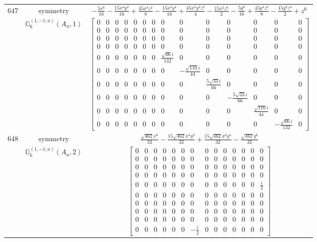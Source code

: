 \documentclass[fleqn,8pt,landscape]{jsarticle}
\begin{document}
\begin{longtable}{ccc}
$ 647 $ & $ \text{symmetry} $ & $ - \frac{5 x^{6}}{16} - \frac{15 x^{4} y^{2}}{16} + \frac{45 x^{4} z^{2}}{8} - \frac{15 x^{2} y^{4}}{16} + \frac{45 x^{2} y^{2} z^{2}}{4} - \frac{15 x^{2} z^{4}}{2} - \frac{5 y^{6}}{16} + \frac{45 y^{4} z^{2}}{8} - \frac{15 y^{2} z^{4}}{2} + z^{6} $ \\
$  $ & $ \mathbb{G}_{6}^{(1,-1;a)}(A_{u},1) $ & $ \begin{bmatrix} 0 & 0 & 0 & 0 & 0 & 0 & 0 & 0 & 0 & 0 & 0 & 0 & 0 & 0 \\ 0 & 0 & 0 & 0 & 0 & 0 & 0 & 0 & 0 & 0 & 0 & 0 & 0 & 0 \\ 0 & 0 & 0 & 0 & 0 & 0 & 0 & 0 & 0 & 0 & 0 & 0 & 0 & 0 \\ 0 & 0 & 0 & 0 & 0 & 0 & 0 & 0 & 0 & 0 & 0 & 0 & 0 & 0 \\ 0 & 0 & 0 & 0 & 0 & 0 & 0 & \frac{\sqrt{66} i}{132} & 0 & 0 & 0 & 0 & 0 & 0 \\ 0 & 0 & 0 & 0 & 0 & 0 & 0 & 0 & - \frac{\sqrt{110} i}{44} & 0 & 0 & 0 & 0 & 0 \\ 0 & 0 & 0 & 0 & 0 & 0 & 0 & 0 & 0 & \frac{5 \sqrt{33} i}{66} & 0 & 0 & 0 & 0 \\ 0 & 0 & 0 & 0 & 0 & 0 & 0 & 0 & 0 & 0 & - \frac{5 \sqrt{33} i}{66} & 0 & 0 & 0 \\ 0 & 0 & 0 & 0 & 0 & 0 & 0 & 0 & 0 & 0 & 0 & \frac{\sqrt{110} i}{44} & 0 & 0 \\ 0 & 0 & 0 & 0 & 0 & 0 & 0 & 0 & 0 & 0 & 0 & 0 & - \frac{\sqrt{66} i}{132} & 0 \end{bmatrix} $ \\ \hline
$ 648 $ & $ \text{symmetry} $ & $ \frac{\sqrt{462} x^{6}}{32} - \frac{15 \sqrt{462} x^{4} y^{2}}{32} + \frac{15 \sqrt{462} x^{2} y^{4}}{32} - \frac{\sqrt{462} y^{6}}{32} $ \\
$  $ & $ \mathbb{G}_{6}^{(1,-1;a)}(A_{u},2) $ & $ \begin{bmatrix} 0 & 0 & 0 & 0 & 0 & 0 & 0 & 0 & 0 & 0 & 0 & 0 & 0 & 0 \\ 0 & 0 & 0 & 0 & 0 & 0 & 0 & 0 & 0 & 0 & 0 & 0 & 0 & 0 \\ 0 & 0 & 0 & 0 & 0 & 0 & 0 & 0 & 0 & 0 & 0 & 0 & 0 & 0 \\ 0 & 0 & 0 & 0 & 0 & 0 & 0 & 0 & 0 & 0 & 0 & 0 & 0 & 0 \\ 0 & 0 & 0 & 0 & 0 & 0 & 0 & 0 & 0 & 0 & 0 & 0 & 0 & \frac{i}{2} \\ 0 & 0 & 0 & 0 & 0 & 0 & 0 & 0 & 0 & 0 & 0 & 0 & 0 & 0 \\ 0 & 0 & 0 & 0 & 0 & 0 & 0 & 0 & 0 & 0 & 0 & 0 & 0 & 0 \\ 0 & 0 & 0 & 0 & 0 & 0 & 0 & 0 & 0 & 0 & 0 & 0 & 0 & 0 \\ 0 & 0 & 0 & 0 & 0 & 0 & 0 & 0 & 0 & 0 & 0 & 0 & 0 & 0 \\ 0 & 0 & 0 & 0 & 0 & 0 & - \frac{i}{2} & 0 & 0 & 0 & 0 & 0 & 0 & 0 \end{bmatrix} $ \\ \hline

\end{longtable}
\end{document}
